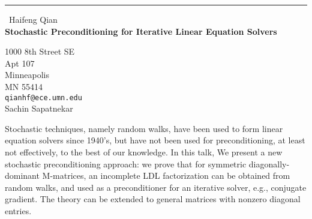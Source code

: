 \documentclass{report}
\begin{document}
\begin{center}
\rule{6in}{1pt} \
{\large Haifeng Qian \\
{\bf Stochastic Preconditioning for Iterative Linear Equation Solvers}}

1000 8th Street SE \\ Apt 107 \\ Minneapolis \\ MN 55414
\\
{\tt qianhf@ece.umn.edu}\\
Sachin Sapatnekar\end{center}

Stochastic techniques, namely random walks, have been used to form linear
equation solvers since 1940's, but have not been used for
preconditioning, at least not effectively, to the best of our knowledge.
In this talk, We present a new stochastic preconditioning approach: we
prove that for symmetric diagonally-dominant M-matrices, an incomplete
LDL factorization can be obtained from random walks, and used as a
preconditioner for an iterative solver, e.g., conjugate gradient. The
theory can be extended to general matrices with nonzero diagonal entries.
\end{document}
